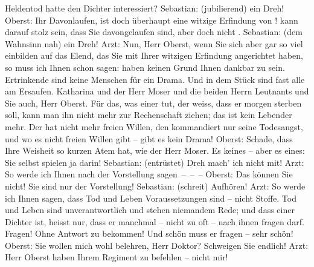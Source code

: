 \begin{ledgroupsized}[t]{13cm}
					Heldentod hatte den Dichter interessiert?\pend
           \pstart
           Sebastian: (jubilierend)  ein Dreh!\pend
           \pstart
           Oberst: Ihr Davonlaufen, ist doch überhaupt eine witzige Erfindung von !  kann darauf stolz
					sein, dass Sie davongelaufen sind, aber doch nicht .\pend
           \pstart
           Sebastian: (dem Wahnsinn nah)  ein Dreh!\pend
           \pstart
           Arzt: Nun, Herr Oberst, wenn Sie sich aber gar so viel einbilden auf das Elend,
					das Sie mit Ihrer witzigen Erfindung angerichtet haben, so muss ich Ihnen schon
					sagen:  haben keinen Grund Ihnen dankbar zu sein.
					Ertrinkende sind keine Menschen für ein Drama. Und in dem Stück sind fast alle
					am Ersaufen. Katharina und der Herr Moser und die beiden Herrn Leutnants und Sie
					auch, Herr Oberst. Für das, was einer tut, der weiss, dass er morgen {\pb}sterben soll, kann man ihn
					nicht mehr zur Rechenschaft ziehen; das ist kein Lebender mehr. Der hat nicht
					mehr freien Willen, den kommandiert nur seine Todesangst, und wo es nicht freien
					Willen gibt – gibt es kein Drama!\pend
           \pstart
           Oberst: Schade, dass Ihre Weisheit so kurzen Atem hat, wie der Herr Moser. Es \label{T_L01900-3v}\label{T_L01900-3h} keines – aber es \label{T_L01900-2v}\label{T_L01900-2h} eines: Sie selbst spielen ja darin!\pend
           \pstart
           Sebastian: (entrüstet)  Dreh mach’ ich nicht
					mit!\pend
           \pstart
           Arzt: So werde ich Ihnen nach der Vorstellung sagen – – –\pend
           \pstart
           Oberst: Das können Sie nicht! Sie sind nur  der
					Vorstellung!\pend
           \pstart
           Sebastian: (schreit) Aufhören!\pend
           \pstart
           Arzt: So werde ich Ihnen sagen, dass Tod und Leben Voraussetzungen sind – nicht
					Stoffe. Tod und Leben sind unverantwortlich und stehen niemandem Rede; und dass
					einer Dichter ist, heisst nur, dass er manchmal – nicht zu oft – nach ihnen
					fragen darf. Fragen! Ohne Antwort zu bekommen! Und schön muss er fragen – sehr
					schön!\pend
           \pstart
           Oberst: Sie wollen mich wohl belehren, Herr Doktor? Schweigen Sie endlich!\pend
           \pstart
           Arzt: Herr Oberst haben Ihrem Regiment zu befehlen – nicht mir!\pend

\end{ledgroupsized}
